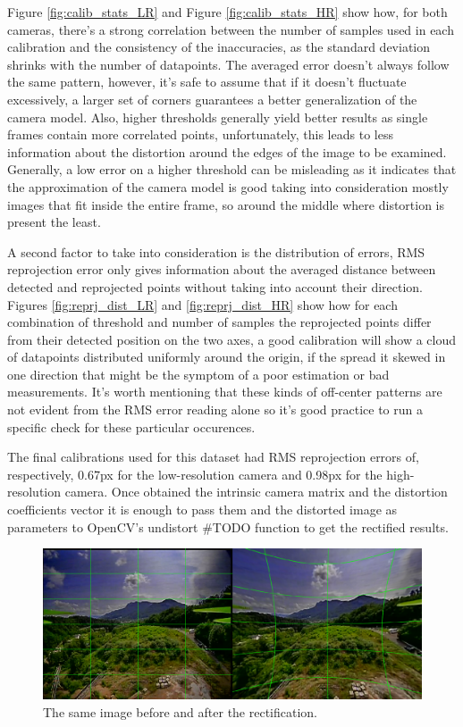 Figure \ref{fig:calib_stats_LR} and Figure \ref{fig:calib_stats_HR} show how, for both cameras, there's a strong correlation between the number of samples used in each calibration and the consistency of the inaccuracies, as the standard deviation shrinks with the number of datapoints. The averaged error doesn't always follow the same pattern, however, it's safe to assume that if it doesn't fluctuate excessively, a larger set of corners guarantees a better generalization of the camera model. Also, higher thresholds generally yield better results as single frames contain more correlated points, unfortunately, this leads to less information about the distortion around the edges of the image to be examined. Generally, a low error on a higher threshold can be misleading as it indicates that the approximation of the camera model is good taking into consideration mostly images that fit inside the entire frame, so around the middle where distortion is present the least.

A second factor to take into consideration is the distribution of errors, RMS reprojection error only gives information about the averaged distance between detected and reprojected points without taking into account their direction. Figures \ref{fig:reprj_dist_LR} and \ref{fig:reprj_dist_HR} show how for each combination of threshold and number of samples the reprojected points differ from their detected position on the two axes, a good calibration will show a cloud of datapoints distributed uniformly around the origin, if the spread it skewed in one direction that might be the symptom of a poor estimation or bad measurements. It's worth mentioning that these kinds of off-center patterns are not evident from the RMS error reading alone so it's good practice to run a specific check for these particular occurences.

The final calibrations used for this dataset had RMS reprojection errors of, respectively, 0.67px for the low-resolution camera and 0.98px for the high-resolution camera. Once obtained the intrinsic camera matrix and the distortion coefficients vector it is enough to pass them and the distorted image as parameters to OpenCV's undistort \#TODO function to get the rectified results.

\begin{figure}[H]
  \centering
  \includegraphics[scale=0.4]{figures/bef_aft_rect.png}
  \caption{The same image before and after the rectification.}
  \label{img:rectify_sbs}
\end{figure}

